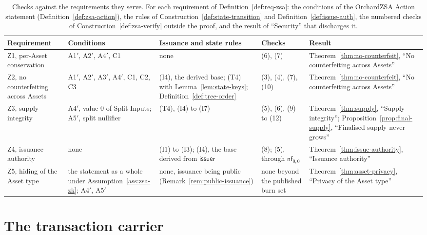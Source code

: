 \documentclass[11pt,a4paper]{article}
\theoremstyle{definition}
\newcommand{\nfsym}{\mathsf{nf}}
\begin{document}
\begin{table}[ht]
\centering\footnotesize\setlength{\tabcolsep}{4pt}
\begin{tabular}{@{}p{1.9cm}p{2.2cm}p{3.1cm}p{1.8cm}p{3.8cm}@{}}
\toprule
Requirement & Conditions & Issuance and state rules & Checks
  & Result \tabularnewline
\midrule
\raggedright Z1, per-Asset conservation &
  \raggedright A1$'$, A2$'$, A4$'$, C1 &
  \raggedright none &
  \raggedright (6), (7) &
  \raggedright Theorem~\ref{thm:no-counterfeit}, ``No counterfeiting across
  Assets'' \tabularnewline
\raggedright Z2, no counterfeiting across Assets &
  \raggedright A1$'$, A2$'$, A3$'$, A4$'$, C1, C2, C3 &
  \raggedright (I4), the derived base; (T4) with Lemma~\ref{lem:state-keys};
  Definition~\ref{def:tree-order} &
  \raggedright (3), (4), (7), (10) &
  \raggedright Theorem~\ref{thm:no-counterfeit}, ``No counterfeiting across
  Assets'' \tabularnewline
\raggedright Z3, supply integrity &
  \raggedright A4$'$, value $0$ of Split Inputs; A5$'$, split nullifier &
  \raggedright (T4), (I4) to (I7) &
  \raggedright (5), (6), (9) to (12) &
  \raggedright Theorem~\ref{thm:supply}, ``Supply integrity'';
  Proposition~\ref{prop:final-supply}, ``Finalised supply never grows''
  \tabularnewline
\raggedright Z4, issuance authority &
  \raggedright none &
  \raggedright (I1) to (I3); (I4), the base derived from $\mathsf{issuer}$ &
  \raggedright (8); (5), through $\nfsym_{0,0}$ &
  \raggedright Theorem~\ref{thm:issue-authority}, ``Issuance authority''
  \tabularnewline
\raggedright Z5, hiding of the Asset type &
  \raggedright the statement as a whole under Assumption~\ref{ass:zsa-zk};
  A4$'$, A5$'$ &
  \raggedright none, issuance being public (Remark~\ref{rem:public-issuance})
  &
  \raggedright none beyond the published burn set &
  \raggedright Theorem~\ref{thm:asset-privacy}, ``Privacy of the Asset type''
  \tabularnewline
\bottomrule
\end{tabular}
\caption{Checks against the requirements they serve. For each requirement of
Definition~\ref{def:req-zsa}: the conditions of the OrchardZSA Action
statement (Definition~\ref{def:zsa-action}), the rules of
Construction~\ref{def:state-transition} and Definition~\ref{def:issue-auth},
the numbered checks of Construction~\ref{def:zsa-verify} outside the proof,
and the result of ``Security'' that discharges it.}
\label{tab:verify-division}
\end{table}

\section{The transaction carrier}\label{sec:carrier}
\end{document}
